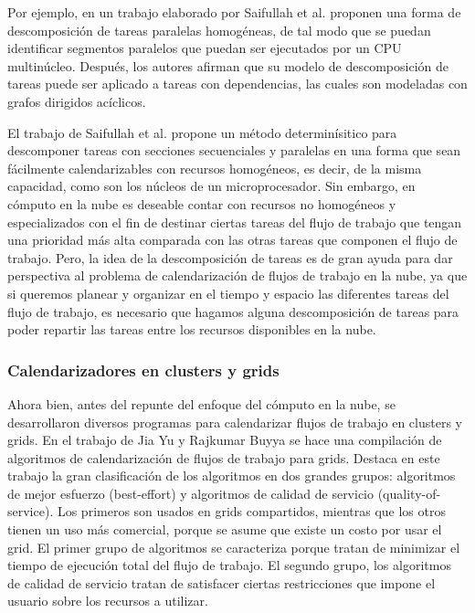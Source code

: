\documentclass[letterpaper, 12pt]{report}
\begin{document}
Por ejemplo, en un trabajo elaborado por Saifullah et al. \cite{saifullah2011multi} proponen una forma de descomposición de tareas paralelas homogéneas, de tal modo que se puedan identificar segmentos paralelos que puedan ser ejecutados por un CPU multinúcleo. Después, los autores afirman que su modelo de descomposición de tareas puede ser aplicado a tareas con dependencias, las cuales son modeladas con grafos dirigidos acíclicos.

El trabajo de Saifullah et al. propone un método determinísitico para descomponer tareas con secciones secuenciales y paralelas en una forma que sean fácilmente calendarizables con recursos homogéneos, es decir, de la misma capacidad, como son los núcleos de un microprocesador. Sin embargo, en cómputo en la nube es deseable contar con recursos no homogéneos y especializados con el fin de destinar ciertas tareas del flujo de trabajo que tengan una prioridad más alta comparada con las otras tareas que componen el flujo de trabajo. Pero, la idea de la descomposición de tareas es de gran ayuda para dar perspectiva al problema de calendarización de flujos de trabajo en la nube, ya que si queremos planear y organizar en el tiempo y espacio las diferentes tareas del flujo de trabajo, es necesario que hagamos alguna descomposición de tareas para poder repartir las tareas entre los recursos disponibles en la nube.

\subsubsection*{Calendarizadores en clusters y grids}

Ahora bien, antes del repunte del enfoque del cómputo en la nube, se desarrollaron diversos programas para calendarizar flujos de trabajo en clusters y grids. En el trabajo de Jia Yu y Rajkumar Buyya \cite{yu2008workflow} se hace una compilación de algoritmos de calendarización de flujos de trabajo para grids. Destaca en este trabajo la gran clasificación de los algoritmos en dos grandes grupos: algoritmos de mejor esfuerzo (best-effort) y algoritmos de calidad de servicio (quality-of-service). Los primeros son usados en grids compartidos, mientras que los otros tienen un uso más comercial, porque se asume que existe un costo por usar el grid. El primer grupo de algoritmos se caracteriza porque tratan de minimizar el tiempo de ejecución total del flujo de trabajo. El segundo grupo, los algoritmos de calidad de servicio tratan de satisfacer ciertas restricciones que impone el usuario sobre los recursos a utilizar.
\end{document}
